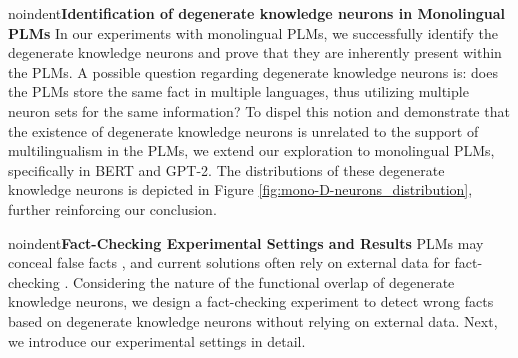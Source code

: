 \documentclass[]{article}
\newcommand{\vpara}[1]{noindent\textbf{#1 }}%
\begin{document}
\vpara{Identification of degenerate knowledge neurons in Monolingual PLMs}
In our experiments with monolingual PLMs, we successfully identify the degenerate knowledge neurons and prove that they are inherently present within the PLMs.
A possible question regarding degenerate knowledge neurons is: does the PLMs store the same fact in multiple languages, thus utilizing multiple neuron sets for the same information? To dispel this notion and demonstrate that the existence of degenerate knowledge neurons is unrelated to the support of multilingualism in the PLMs, we extend our exploration to monolingual PLMs, specifically in BERT and GPT-2. The distributions of these degenerate knowledge neurons is depicted in Figure \ref{fig:mono-D-neurons_distribution}, further reinforcing our conclusion.

\vpara{Fact-Checking Experimental Settings and Results}
PLMs may conceal false facts \cite{hallucination_chatgpt1,hallucination_chatgpt2}, and current solutions often rely on external data for fact-checking \cite{fact-checking-survey}.
Considering the nature of the functional overlap of degenerate knowledge neurons, we design a fact-checking experiment to detect wrong facts based on degenerate knowledge neurons without relying on external data. Next, we introduce our experimental settings in detail.
\end{document}
